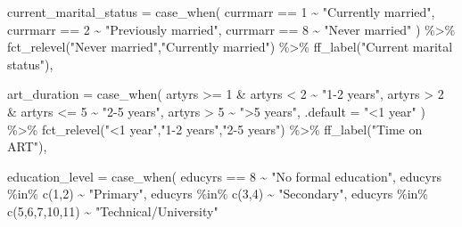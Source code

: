 \documentclass[
  letterpaper,
  DIV=11,
  numbers=noendperiod]{scrartcl}
\newenvironment{Shaded}{\begin{snugshade}}{\end{snugshade}}
\newcommand{\AttributeTok}[1]{\textcolor[rgb]{0.40,0.45,0.13}{#1}}
\newcommand{\DecValTok}[1]{\textcolor[rgb]{0.68,0.00,0.00}{#1}}
\newcommand{\FunctionTok}[1]{\textcolor[rgb]{0.28,0.35,0.67}{#1}}
\newcommand{\NormalTok}[1]{\textcolor[rgb]{0.00,0.23,0.31}{#1}}
\newcommand{\SpecialCharTok}[1]{\textcolor[rgb]{0.37,0.37,0.37}{#1}}
\newcommand{\StringTok}[1]{\textcolor[rgb]{0.13,0.47,0.30}{#1}}
\begin{document}
\begin{Shaded}
\begin{Highlighting}[]
         \AttributeTok{current\_marital\_status =} \FunctionTok{case\_when}\NormalTok{(}
\NormalTok{           currmarr }\SpecialCharTok{==} \DecValTok{1} \SpecialCharTok{\textasciitilde{}} \StringTok{"Currently married"}\NormalTok{,}
\NormalTok{           currmarr }\SpecialCharTok{==} \DecValTok{2} \SpecialCharTok{\textasciitilde{}} \StringTok{"Previously married"}\NormalTok{,}
\NormalTok{           currmarr }\SpecialCharTok{==} \DecValTok{8} \SpecialCharTok{\textasciitilde{}} \StringTok{"Never married"}
\NormalTok{           ) }\SpecialCharTok{\%\textgreater{}\%} 
           \FunctionTok{fct\_relevel}\NormalTok{(}\StringTok{"Never married"}\NormalTok{,}\StringTok{"Currently married"}\NormalTok{) }\SpecialCharTok{\%\textgreater{}\%} 
           \FunctionTok{ff\_label}\NormalTok{(}\StringTok{"Current marital status"}\NormalTok{),}
         
         \AttributeTok{art\_duration =} \FunctionTok{case\_when}\NormalTok{(}
\NormalTok{           artyrs }\SpecialCharTok{\textgreater{}=} \DecValTok{1} \SpecialCharTok{\&}\NormalTok{ artyrs }\SpecialCharTok{\textless{}} \DecValTok{2} \SpecialCharTok{\textasciitilde{}} \StringTok{"1{-}2 years"}\NormalTok{,}
\NormalTok{           artyrs }\SpecialCharTok{\textgreater{}} \DecValTok{2} \SpecialCharTok{\&}\NormalTok{  artyrs }\SpecialCharTok{\textless{}=} \DecValTok{5} \SpecialCharTok{\textasciitilde{}} \StringTok{"2{-}5 years"}\NormalTok{,}
\NormalTok{           artyrs }\SpecialCharTok{\textgreater{}} \DecValTok{5} \SpecialCharTok{\textasciitilde{}} \StringTok{"\textgreater{}5 years"}\NormalTok{,}
           \AttributeTok{.default =}  \StringTok{"\textless{}1 year"}
\NormalTok{         ) }\SpecialCharTok{\%\textgreater{}\%} 
           \FunctionTok{fct\_relevel}\NormalTok{(}\StringTok{"\textless{}1 year"}\NormalTok{,}\StringTok{"1{-}2 years"}\NormalTok{,}\StringTok{"2{-}5 years"}\NormalTok{) }\SpecialCharTok{\%\textgreater{}\%} 
           \FunctionTok{ff\_label}\NormalTok{(}\StringTok{"Time on ART"}\NormalTok{),}
         
         \AttributeTok{education\_level =} \FunctionTok{case\_when}\NormalTok{(}
\NormalTok{           educyrs }\SpecialCharTok{==} \DecValTok{8} \SpecialCharTok{\textasciitilde{}} \StringTok{"No formal education"}\NormalTok{,}
\NormalTok{           educyrs }\SpecialCharTok{\%in\%} \FunctionTok{c}\NormalTok{(}\DecValTok{1}\NormalTok{,}\DecValTok{2}\NormalTok{) }\SpecialCharTok{\textasciitilde{}} \StringTok{"Primary"}\NormalTok{,}
\NormalTok{           educyrs }\SpecialCharTok{\%in\%} \FunctionTok{c}\NormalTok{(}\DecValTok{3}\NormalTok{,}\DecValTok{4}\NormalTok{) }\SpecialCharTok{\textasciitilde{}} \StringTok{"Secondary"}\NormalTok{,}
\NormalTok{           educyrs }\SpecialCharTok{\%in\%} \FunctionTok{c}\NormalTok{(}\DecValTok{5}\NormalTok{,}\DecValTok{6}\NormalTok{,}\DecValTok{7}\NormalTok{,}\DecValTok{10}\NormalTok{,}\DecValTok{11}\NormalTok{) }\SpecialCharTok{\textasciitilde{}} \StringTok{"Technical/University"}
          

\end{Highlighting}
\end{Shaded}
\end{document}
